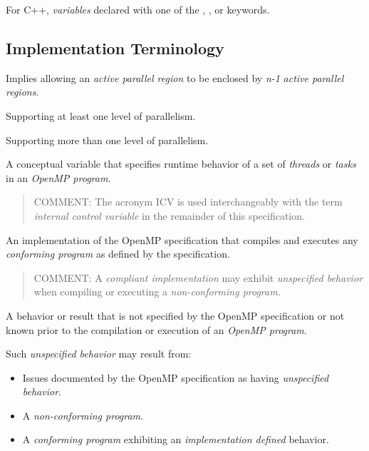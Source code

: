 \glossarydefstart
For C++, \emph{variables} declared with one of the , , or  keywords.
\glossarydefend





\subsection{Implementation Terminology}
\label{subsec:Implementation Terminology}
\glossarydefstart
Implies allowing an \emph{active parallel region} to be enclosed by \emph{n-1} \emph{active parallel
regions}.
\glossarydefend

\glossarydefstart
Supporting at least one level of parallelism.
\glossarydefend
\bigskip

\glossarydefstart
Supporting more than one level of parallelism.
\glossarydefend
\bigskip

\glossarydefstart
A conceptual variable that specifies runtime behavior of a set of \emph{threads} or \emph{tasks}
in an \emph{OpenMP program}.

\begin{quote}
COMMENT: The acronym ICV is used interchangeably with the term \emph{internal
control variable} in the remainder of this specification.
\end{quote}
\glossarydefend

\glossarydefstart
An implementation of the OpenMP specification that compiles and executes any
\emph{conforming program} as defined by the specification.

\begin{quote}
COMMENT: A \emph{compliant implementation} may exhibit \emph{unspecified behavior} when
compiling or executing a \emph{non-conforming program}.
\end{quote}
\glossarydefend

\glossarydefstart
A behavior or result that is not specified by the OpenMP specification or not
known prior to the compilation or execution of an \emph{OpenMP program}.

Such \emph{unspecified behavior} may result from:

\begin{itemize}
\item Issues documented by the OpenMP specification as having \emph{unspecified
behavior}.

\item A \emph{non-conforming program}.

\item A \emph{conforming program} exhibiting an \emph{implementation defined} behavior.
\end{itemize}
\glossarydefend

